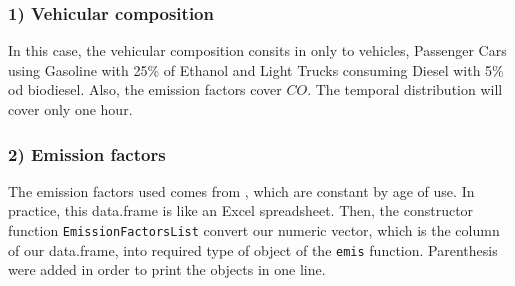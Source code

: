 \documentclass[12pt,graybox,envcountchap,sectrefs]{krantz}
\makeatletter
\newenvironment{Shaded}{\begin{snugshade}}{\end{snugshade}}
\newcommand{\KeywordTok}[1]{\textcolor[rgb]{0.13,0.29,0.53}{\textbf{#1}}}
\newcommand{\DecValTok}[1]{\textcolor[rgb]{0.00,0.00,0.81}{#1}}
\newcommand{\StringTok}[1]{\textcolor[rgb]{0.31,0.60,0.02}{#1}}
\newcommand{\CommentTok}[1]{\textcolor[rgb]{0.56,0.35,0.01}{\textit{#1}}}
\newcommand{\OperatorTok}[1]{\textcolor[rgb]{0.81,0.36,0.00}{\textbf{#1}}}
\newcommand{\NormalTok}[1]{#1}
\newenvironment{kframe}{%
\medskip{}
\setlength{\fboxsep}{.8em}
 \def\at@end@of@kframe{}%
 \ifinner\ifhmode%
  \def\at@end@of@kframe{\end{minipage}}%
  \begin{minipage}{\columnwidth}%
 \fi\fi%
 \def\FrameCommand##1{\hskip\@totalleftmargin \hskip-\fboxsep
 \colorbox{shadecolor}{##1}\hskip-\fboxsep
     \hskip-\linewidth \hskip-\@totalleftmargin \hskip\columnwidth}%
 \MakeFramed {\advance\hsize-\width
   \@totalleftmargin\z@ \linewidth\hsize
   \@setminipage}}%
 {\par\unskip\endMakeFramed%
 \at@end@of@kframe}
\renewenvironment{Shaded}{\begin{kframe}}{\end{kframe}}
\theoremstyle{definition}
\theoremstyle{definition}
\theoremstyle{definition}
\theoremstyle{remark}
\makeatother
\begin{document}
\begin{Shaded}
\end{Shaded}

\subsubsection{1) Vehicular composition}\label{vehicular-composition-1}

In this case, the vehicular composition consits in only to vehicles,
Passenger Cars using Gasoline with 25\% of Ethanol and Light Trucks
consuming Diesel with 5\% od biodiesel. Also, the emission factors cover
\(CO\). The temporal distribution will cover only one hour.

\begin{Shaded}
\end{Shaded}

\subsubsection{2) Emission factors}\label{emission-factors}

The emission factors used comes from \citet{CETESB2015}, which are
constant by age of use. In practice, this data.frame is like an Excel
spreadsheet. Then, the constructor function \texttt{EmissionFactorsList}
convert our numeric vector, which is the column of our data.frame, into
required type of object of the \texttt{emis} function. Parenthesis were
added in order to print the objects in one line.

\begin{Shaded}
\end{Shaded}
\end{document}
